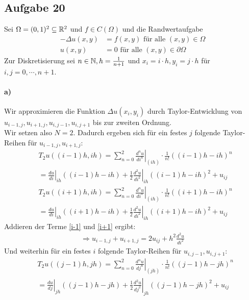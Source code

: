 \subsection*{Aufgabe 20}
Sei $\Omega=(0,1)^2 \subseteq \mathbb R^2$ und $f \in C(\Omega)$ und die Randwertaufgabe 
\begin{align*}
-\Delta u(x,y)&=f(x,y) \text{ für alle }(x,y) \in \Omega\\
u(x,y)&=0 \text{ für alle } (x,y) \in \partial\Omega
\end{align*}
Zur Diskretisierung sei $n\in \mathbb N, h=\frac{1}{n+1}$ und $x_i=i \cdot h, y_i=j\cdot h$ für $i,j=0, \cdots, n+1$. 
\paragraph*{a)}
Wir approximieren die Funktion $\Delta u(x_i,y_i)$ durch Taylor-Entwicklung von $u_{i-1,j}, u_{i+1,j}, u_{i,j-1}, u_{i,j+1}$ bis zur zweiten Ordnung.\\
\newline
Wir setzen also $N=2$. Dadurch ergeben sich für ein festes $j$ folgende Taylor-Reihen für $u_{i-1,j}, u_{i+1,j}$:
\begin{align}
&T_2 u((i-1)h, ih)=\sum_{n=0}^2 \left. \frac{d^n u}{di^n} \right|_{(ih)} \cdot \frac{1}{n!}((i-1)h-ih)^n\\ &=\left.\frac{du}{di}\right |_{ih} ((i-1)h-ih)+\left.\frac{1}{2}\frac{d^2u}{di^2}\right|_{ih}((i-1)h-ih)^2+u_{ij}\label{i-1}\end{align}
\begin{align}
&T_2 u((i+1)h, ih)=\sum_{n=0}^2 \left. \frac{d^n u}{di^n} \right|_{(ih)} \cdot \frac{1}{n!}((i+1)h-ih)^n\\ &=\left.\frac{du}{di}\right |_{ih} ((i+1)h-ih)+\left.\frac{1}{2}\frac{d^2u}{di^2}\right|_{ih}((i+1)h-ih)^2+u_{ij}\label{i+1}
\end{align}
Addieren der Terme \eqref{i-1} und \eqref{i+1} ergibt:
\begin{align*}
\Rightarrow u_{i-1,j}+u_{i+1,j}=2u_{ij} + h^2 \frac{d^2u}{di^2}
\end{align*}
Und weiterhin für ein festes $i$ folgende Taylor-Reihen für $u_{i,j-1}, u_{i,j+1}$:
\begin{align}
&T_2 u((j-1)h, jh)=\sum_{n=0}^2 \left. \frac{d^n u}{dj^n} \right|_{(jh)} \cdot \frac{1}{n!}((j-1)h-jh)^n\\ &=\left.\frac{du}{dj}\right |_{jh} ((j-1)h-jh)+\left.\frac{1}{2}\frac{d^2u}{dj^2}\right|_{jh}((j-1)h-jh)^2+u_{ij}\label{j-1}\end{align}
